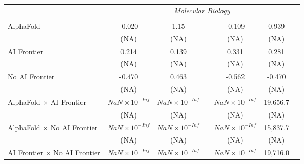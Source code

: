 \begin{tabular}{lcccccc}
 & \multicolumn{6}{c}{\textit{Molecular Biology}} \\ \\
   AlphaFold                                                                  & -0.020                 & 1.15                   &                        & -0.109                 & 0.939    &   \\   
                                                                              & (NA)                   & (NA)                   &                        & (NA)                   & (NA)     &   \\   
   AI Frontier                                                                & 0.214                  & 0.139                  &                        & 0.331                  & 0.281    &   \\   
                                                                              & (NA)                   & (NA)                   &                        & (NA)                   & (NA)     &   \\   
   No AI Frontier                                                             & -0.470                 & 0.463                  &                        & -0.562                 & -0.470   &   \\   
                                                                              & (NA)                   & (NA)                   &                        & (NA)                   & (NA)     &   \\   
   AlphaFold $\times$ AI Frontier                                             & $NaN\times 10^{-Inf}$  & $NaN\times 10^{-Inf}$  &                        & $NaN\times 10^{-Inf}$  & 19,656.7 &   \\   
                                                                              & (NA)                   & (NA)                   &                        & (NA)                   & (NA)     &   \\   
   AlphaFold $\times$ No AI Frontier                                          & $NaN\times 10^{-Inf}$  & $NaN\times 10^{-Inf}$  &                        & $NaN\times 10^{-Inf}$  & 15,837.7 &   \\   
                                                                              & (NA)                   & (NA)                   &                        & (NA)                   & (NA)     &   \\   
   AI Frontier $\times$ No AI Frontier                                        & $NaN\times 10^{-Inf}$  & $NaN\times 10^{-Inf}$  &                        & $NaN\times 10^{-Inf}$  & 19,716.0 &   \\   

\end{tabular}

